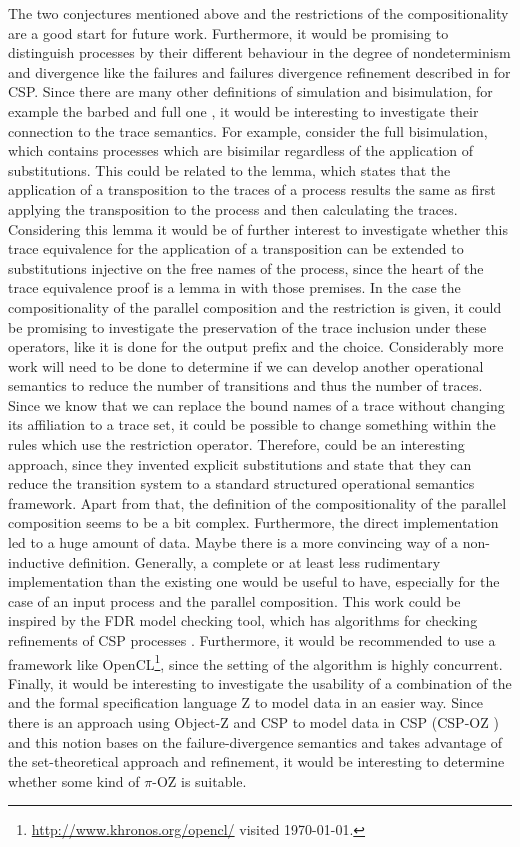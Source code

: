 The two conjectures mentioned above and the restrictions of the compositionality are a good start for future work. Furthermore, it would be promising to distinguish processes by their different behaviour in the degree of nondeterminism and divergence like the failures and failures divergence refinement described in \cite{roscoe} for \gls{CSP}. Since there are many other definitions of simulation and bisimulation, for example the barbed and full one \cite{sangiorgi}, it would be interesting to investigate their connection to the trace semantics. For example, consider the full bisimulation, which contains processes which are bisimilar regardless of the application of substitutions. This could be related to the lemma, which states that the application of a transposition to the traces of a process results the same as first applying the transposition to the process and then calculating the traces. Considering this lemma it would be of further interest to investigate whether this trace equivalence for the application of a transposition can be extended to substitutions injective on the free names of the process, since the heart of the trace equivalence proof is a lemma in \cite{sangiorgi} with those premises. In the case the compositionality of the parallel composition and the restriction is given, it could be promising to investigate the preservation of the trace inclusion under these operators, like it is done for the output prefix and the choice. Considerably more work will need to be done to determine if we can develop another operational semantics to reduce the number of transitions and thus the number of traces. Since we know that we can replace the bound names of a trace without changing its affiliation to a trace set, it could be possible to change something within the rules which use the restriction operator. Therefore, \cite{paolaExplicitSubs} could be an interesting approach, since they invented explicit substitutions and state that they can reduce the transition system to a standard structured operational semantics framework. Apart from that, the definition of the compositionality of the parallel composition seems to be a bit complex. Furthermore, the direct implementation led to a huge amount of data. Maybe there is a more convincing way of a non-inductive definition. Generally, a complete or at least less rudimentary implementation than the existing one would be useful to have, especially for the case of an input process and the parallel composition. This work could be inspired by the FDR model checking tool, which has algorithms for checking refinements of CSP processes \cite{fdr}. Furthermore, it would be recommended to use a framework like OpenCL\footnote{\url{http://www.khronos.org/opencl/} visited \today.}, since the setting of the algorithm is highly concurrent. Finally, it would be interesting to investigate the usability of a combination of the \picalc{} and the formal specification language Z \cite{zNotation, spivey} to model data in an easier way. Since there is an approach using Object-Z \cite{Object-Z,OZSmith} and CSP to model data in CSP (CSP-OZ \cite{fischerCsp}) and this notion bases on the failure-divergence semantics and takes advantage of the set-theoretical approach and refinement, it would be interesting to determine whether some kind of $\pi$-OZ is suitable.

